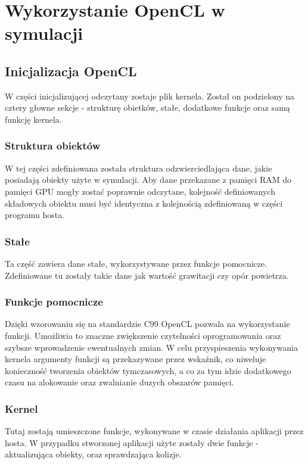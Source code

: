 \chapter{Wykorzystanie OpenCL w symulacji}

\section{Inicjalizacja OpenCL}
W części inicjalizującej odczytany zostaje plik kernela. Został on podzielony na cztery głowne sekcje - strukturę obietków, stałe, dodatkowe funkcje oraz samą funkcję kernela.

\subsection{Struktura obiektów}
W tej części zdefiniowana została struktura odzwierciedlająca dane, jakie posiadają obiekty użyte w symulacji. Aby dane przekazane z pamięci RAM do pamięci GPU mogły zostać poprawnie odczytane, kolejność definiowanych składowych obiektu musi być identyczna z kolejnością zdefiniowaną w części programu hosta.

\subsection{Stałe}
Ta część zawiera dane stałe, wykorzystywane przez funkcje pomocnicze. Zdefiniowane tu zostały takie dane jak wartość grawitacji czy opór powietrza.

\subsection{Funkcje pomocnicze}
Dzięki wzorowaniu się na standardzie C99 OpenCL pozwala na wykorzystanie funkcji. Umożliwia to znaczne zwiększenie czytelności oprogramowania oraz szybsze wprowadzenie ewentualnych zmian. W celu przyspieszenia wykonywania kernela argumenty funkcji są przekazywane przez wskaźnik, co niweluje konieczność tworzenia obiektów tymczasowych, a co za tym idzie dodatkowego czasu na alokowanie oraz zwalnianie duzych obszarów pamięci.
\newpage
\subsection{Kernel}
Tutaj zostają umieszczone funkcje, wykonywane w czasie działania aplikacji przez hosta. W przypadku stworzonej aplikacji użyte zostały dwie funkcje - aktualizująca obiekty, oraz sprawdzająca kolizje.

